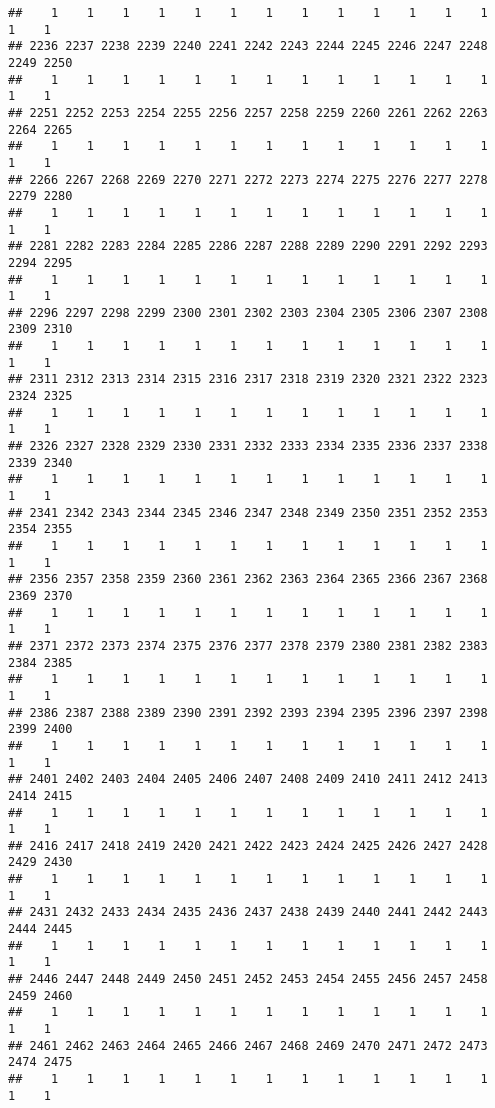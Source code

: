 \documentclass[]{article}
\begin{document}
\begin{verbatim}
##    1    1    1    1    1    1    1    1    1    1    1    1    1    1    1 
## 2236 2237 2238 2239 2240 2241 2242 2243 2244 2245 2246 2247 2248 2249 2250 
##    1    1    1    1    1    1    1    1    1    1    1    1    1    1    1 
## 2251 2252 2253 2254 2255 2256 2257 2258 2259 2260 2261 2262 2263 2264 2265 
##    1    1    1    1    1    1    1    1    1    1    1    1    1    1    1 
## 2266 2267 2268 2269 2270 2271 2272 2273 2274 2275 2276 2277 2278 2279 2280 
##    1    1    1    1    1    1    1    1    1    1    1    1    1    1    1 
## 2281 2282 2283 2284 2285 2286 2287 2288 2289 2290 2291 2292 2293 2294 2295 
##    1    1    1    1    1    1    1    1    1    1    1    1    1    1    1 
## 2296 2297 2298 2299 2300 2301 2302 2303 2304 2305 2306 2307 2308 2309 2310 
##    1    1    1    1    1    1    1    1    1    1    1    1    1    1    1 
## 2311 2312 2313 2314 2315 2316 2317 2318 2319 2320 2321 2322 2323 2324 2325 
##    1    1    1    1    1    1    1    1    1    1    1    1    1    1    1 
## 2326 2327 2328 2329 2330 2331 2332 2333 2334 2335 2336 2337 2338 2339 2340 
##    1    1    1    1    1    1    1    1    1    1    1    1    1    1    1 
## 2341 2342 2343 2344 2345 2346 2347 2348 2349 2350 2351 2352 2353 2354 2355 
##    1    1    1    1    1    1    1    1    1    1    1    1    1    1    1 
## 2356 2357 2358 2359 2360 2361 2362 2363 2364 2365 2366 2367 2368 2369 2370 
##    1    1    1    1    1    1    1    1    1    1    1    1    1    1    1 
## 2371 2372 2373 2374 2375 2376 2377 2378 2379 2380 2381 2382 2383 2384 2385 
##    1    1    1    1    1    1    1    1    1    1    1    1    1    1    1 
## 2386 2387 2388 2389 2390 2391 2392 2393 2394 2395 2396 2397 2398 2399 2400 
##    1    1    1    1    1    1    1    1    1    1    1    1    1    1    1 
## 2401 2402 2403 2404 2405 2406 2407 2408 2409 2410 2411 2412 2413 2414 2415 
##    1    1    1    1    1    1    1    1    1    1    1    1    1    1    1 
## 2416 2417 2418 2419 2420 2421 2422 2423 2424 2425 2426 2427 2428 2429 2430 
##    1    1    1    1    1    1    1    1    1    1    1    1    1    1    1 
## 2431 2432 2433 2434 2435 2436 2437 2438 2439 2440 2441 2442 2443 2444 2445 
##    1    1    1    1    1    1    1    1    1    1    1    1    1    1    1 
## 2446 2447 2448 2449 2450 2451 2452 2453 2454 2455 2456 2457 2458 2459 2460 
##    1    1    1    1    1    1    1    1    1    1    1    1    1    1    1 
## 2461 2462 2463 2464 2465 2466 2467 2468 2469 2470 2471 2472 2473 2474 2475 
##    1    1    1    1    1    1    1    1    1    1    1    1    1    1    1 

\end{verbatim}
\end{document}
